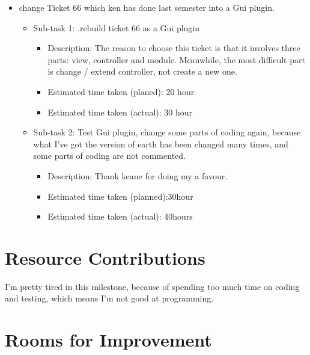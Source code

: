 \begin{itemize}
\item change Ticket 66 which ken has done last semester into a Gui plugin.
	     \begin{itemize}
              \item Sub-task 1: .rebuild ticket 66 as a Gui plugin
                \begin{itemize}
	         \item Description: The reason to choose this ticket is that it involves three parts: view, controller and module. Meanwhile, the most difficult part is change / extend controller, not create a new one.
	          \item Estimated time taken (planed): 20 hour
                  \item Estimated time taken (actual): 30 hour
	     \end{itemize}
             \end{itemize}

     \begin{itemize}
            \item Sub-task 2: Test Gui plugin, change some parts of coding again, because what I've got the version of earth has been changed many times, and some parts of coding are not commented.
	            \begin{itemize}
				    \item Description: Thank keane for doing my a favour.
					\item Estimated time taken (planned):30hour
					\item Estimated time taken (actual): 40hours
		     \end{itemize}
                     \end{itemize}
  \end{itemize}

\section*{Resource Contributions}

I'm pretty tired in this milestone, because of spending too much time on coding and testing, which means I'm not good at programming.

\section*{Rooms for Improvement}

